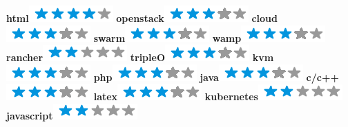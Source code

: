 \documentclass[]{friggeri-cv}
\begin{document}
\begin{aside}
        \textbf{html}\includegraphics[scale=0.40]{img/4stars.png}
        \textbf{openstack}\includegraphics[scale=0.40]{img/3stars.png}
        \textbf{cloud}\includegraphics[scale=0.40]{img/3stars.png}
        \textbf{swarm}\includegraphics[scale=0.40]{img/3stars.png}
        \textbf{wamp}\includegraphics[scale=0.40]{img/3stars.png}
        \textbf{rancher}\includegraphics[scale=0.40]{img/2stars.png}
        \textbf{tripleO}\includegraphics[scale=0.40]{img/3stars.png}
        \textbf{kvm}\includegraphics[scale=0.40]{img/3stars.png}
        \textbf{php}\includegraphics[scale=0.40]{img/3stars.png}
        \textbf{java}\includegraphics[scale=0.40]{img/3stars.png}
        \textbf{c/c++}\includegraphics[scale=0.40]{img/3stars.png}
        \textbf{latex}\includegraphics[scale=0.40]{img/3stars.png}
        \textbf{kubernetes}\includegraphics[scale=0.40]{img/2stars.png}
        \textbf{javascript}\includegraphics[scale=0.40]{img/2stars.png}
        ~

\end{aside}
\end{document}
